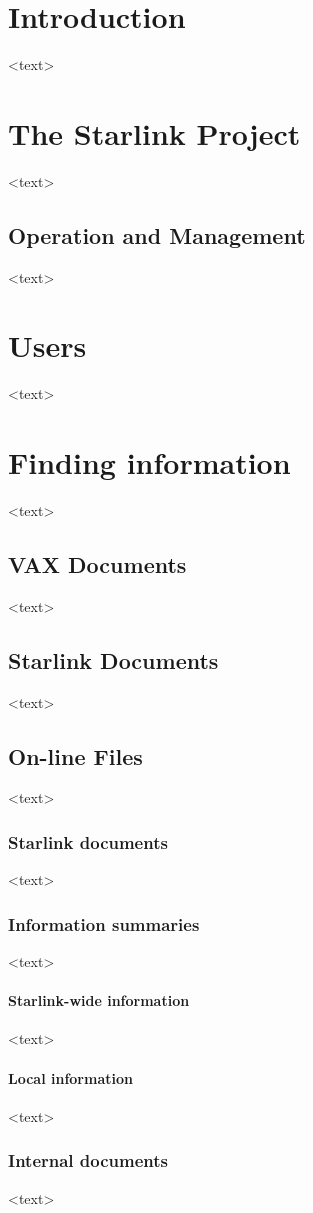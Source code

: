 \documentclass[twoside,11pt]{starlink}
\begin{document}
\begin{terminalv}
\section  {Introduction}
     <text>
\section{The Starlink Project}
     <text>
\subsection{Operation and Management}
     <text>
\section{Users}
     <text>
\section{Finding information}
     <text>
\subsection{VAX Documents}
     <text>
\subsection{Starlink Documents}
     <text>
\subsection{On-line Files}
     <text>
\subsubsection{Starlink documents}
     <text>
\subsubsection{Information summaries}
     <text>
\paragraph {Starlink-wide information}
     <text>
\paragraph {Local information}
     <text>
\subsubsection{Internal documents}
     <text>

\end{terminalv}
\end{document}
